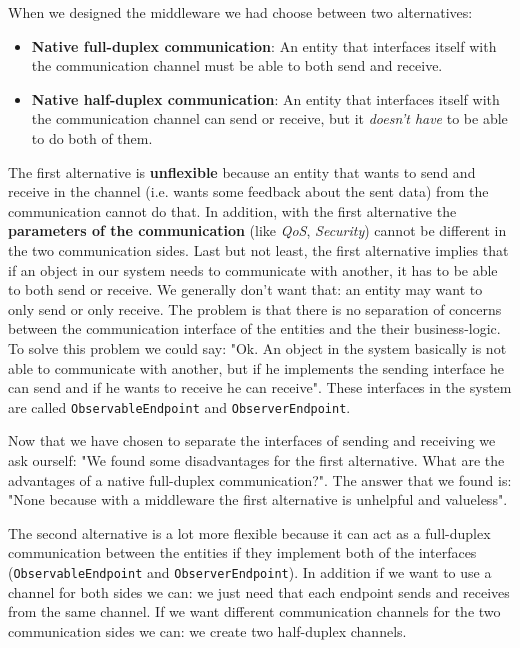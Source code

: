 \documentclass[unicode]{llncs}
\begin{document}
    When we designed the middleware we had choose between two alternatives:
    \begin{itemize}
      \item \textbf{Native full-duplex communication}:
        An entity that interfaces itself with the communication channel
        must be able to both send and receive.
      \item \textbf{Native half-duplex communication}:
        An entity that interfaces itself with the communication channel can
        send or receive, but it \textit{doesn't have} to be able to do both
        of them.
    \end{itemize}
    The first alternative is \textbf{unflexible} because an entity that wants
    to send and receive in the channel (i.e. wants some feedback about the
    sent data) from the communication cannot do that.\newline
    In addition, with the first alternative the
    \textbf{parameters of the communication} (like \textit{QoS},
    \textit{Security}) cannot be different in the two communication sides.\newline
    Last but not least, the first alternative implies that if an object in our
    system needs to communicate with another, it has to be able to both
    send or receive. We generally don't want that: an entity may want to only
    send or only receive. The problem is that there is no separation of concerns
    between the communication interface of the entities and the their
    business-logic.
    To solve this problem we could say: "Ok. An object in the system basically
    is not able to communicate with another, but if he implements the sending
    interface he can send and if he wants to receive he can receive". These
    interfaces in the system are called \texttt{ObservableEndpoint} and
    \texttt{ObserverEndpoint}.

    Now that we have chosen to separate the interfaces of sending and receiving
    we ask ourself:\newline
    "We found some disadvantages for the first alternative. What are the
    advantages of a native full-duplex communication?".\newline
    The answer that we found is: "None because with a middleware the
    first alternative is unhelpful and valueless".

    The second alternative is a lot more flexible because it can act as
    a full-duplex communication between the entities if they implement
    both of the interfaces (\texttt{ObservableEndpoint} and
    \texttt{ObserverEndpoint}).\newline
    In addition if we want to use a channel for both sides we can: we just need
    that each endpoint sends and receives from the same channel.
    If we want different communication channels for the two communication sides
    we can: we create two half-duplex channels.
\end{document}
